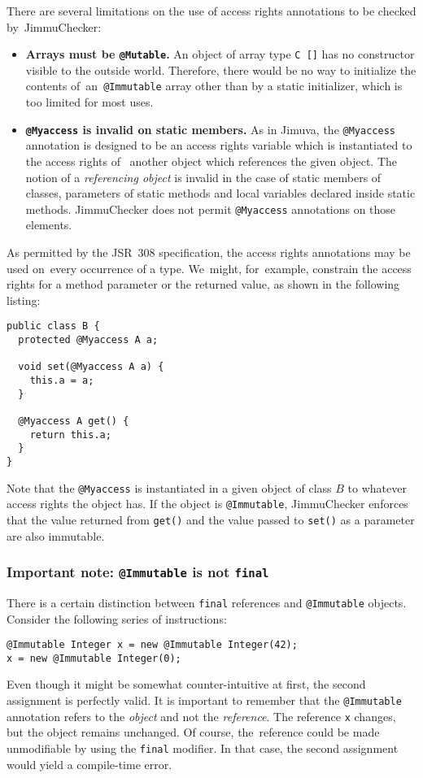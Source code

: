 \documentclass{pracamgr}
\theoremstyle{break}
\theoremstyle{break}
\theoremstyle{break}
\begin{document}
There are several limitations on the use of access rights annotations
to be checked by~JimmuChecker:
\begin{itemize}
\item \textbf{Arrays must be \texttt{@Mutable}.} An object of array
  type \texttt{C []} has no constructor visible to the outside
  world. Therefore, there would be no way to initialize the contents
  of~an~\texttt{@Immutable} array other than by a static initializer,
  which is too limited for most uses.
\item \textbf{\texttt{@Myaccess} is invalid on static members.} As in
  Jimuva, the \texttt{@Myaccess} annotation is designed to be an
  access rights variable which is instantiated to the access rights of~
  another object which references the given object. The notion of a
  \emph{referencing object} is invalid in the case of static members
  of classes, parameters of static methods and local variables
  declared inside static methods. JimmuChecker does not permit
  \texttt{@Myaccess} annotations on those elements. 
\end{itemize}

As permitted by the JSR~308 specification, the access rights
annotations may be used on~every occurrence of a type. We~might,
for~example, constrain the access rights for a method parameter or the
returned value, as shown in the following listing:
\begin{lstlisting}
public class B {
  protected @Myaccess A a;

  void set(@Myaccess A a) {
    this.a = a;
  }

  @Myaccess A get() {
    return this.a;
  }
}
\end{lstlisting}
Note that the \texttt{@Myaccess} is instantiated in a given object of
class $B$ to whatever access rights the object has. If the object is
\texttt{@Immutable}, JimmuChecker enforces that the value returned
from \texttt{get()} and the value passed to \texttt{set()} as a
parameter are also immutable.

\subsubsection{Important note: \texttt{@Immutable} is not \texttt{final}}

There is a certain distinction between \texttt{final} references and
\texttt{@Immutable} objects. Consider the following series of
instructions:
\begin{lstlisting}
@Immutable Integer x = new @Immutable Integer(42);
x = new @Immutable Integer(0);
\end{lstlisting}
Even though it might be somewhat counter-intuitive at first, the
second assignment is perfectly valid. It is important to remember that
the \texttt{@Immutable} annotation refers to the \emph{object} and not
the \emph{reference}. The reference \texttt{x} changes, but the object
remains unchanged. Of course, the~reference could be made unmodifiable
by using the \texttt{final} modifier. In that case, the second
assignment would yield a compile-time error.
\end{document}

